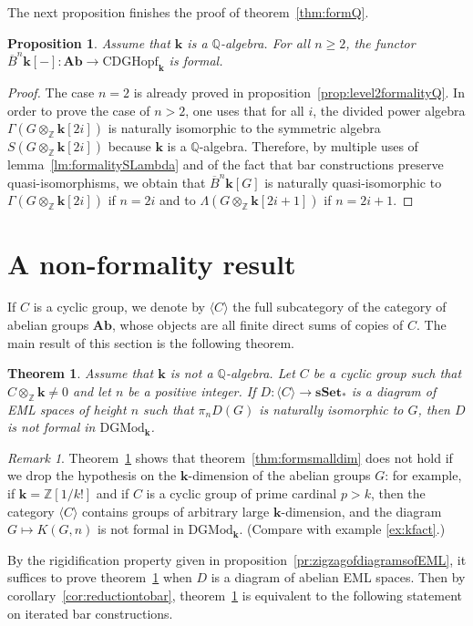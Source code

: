 \documentclass{amsart}
\newtheorem{proposition}[formula]{Proposition}
\newtheorem{theorem}[formula]{Theorem}
\theoremstyle{definition}
\theoremstyle{remark}
\newtheorem{remark}[formula]{Remark}
\newcommand{\Z}{\mathbb Z}
\newcommand{\Q}{\mathbb Q}
\renewcommand{\ge}{\geqslant}
\newcommand{\Ab}{\mathbf{Ab}}
\newcommand{\sset}{\mathbf{sSet}}
\def\k{\mathbf{k}}
\begin{document}
The next proposition finishes the proof of theorem~\ref{thm:formQ}.

\begin{proposition}\label{prop:higherlevelformalityQ}
	Assume that $\k$ is a $\Q$-algebra. For all $n\ge 2$, the functor $\overline{B}^n\k[-]:\Ab\to \mathrm{CDGHopf}_\k$ is formal.   
\end{proposition}
\begin{proof}
	The case $n=2$ is already proved in proposition~\ref{prop:level2formalityQ}. In order to prove the case of $n>2$, one uses that for all $i$, the divided power algebra $\Gamma(G\otimes_\Z\k[2i])$ is naturally isomorphic to the symmetric algebra $S(G\otimes_\Z\k[2i])$ because $\k$ is a $\Q$-algebra. Therefore, by multiple uses of lemma~\ref{lm:formalitySLambda} and of the fact that bar constructions preserve quasi-isomorphisms, we obtain that $\overline{B}^n\k[G]$ is naturally quasi-isomorphic to $\Gamma(G\otimes_\Z\k[2i])$ if $n=2i$ and to $\Lambda(G\otimes_\Z\k[2i+1])$ if $n=2i+1$.
\end{proof}
	
\section{A non-formality result}\label{sec-nonformalityFp}

If $C$ is a cyclic group, we denote by $\langle C\rangle$ the full subcategory of the category of abelian groups $\Ab$, whose objects are all finite direct sums of copies of $C$.
The main result of this section is the following theorem. 
\begin{theorem}\label{thm:nonformality1}
	Assume that $\k$ is not a $\Q$-algebra. Let $C$ be a cyclic group such that $C\otimes_{\Z}\k\ne 0$ and let $n$ be a positive integer. 
    If $D:\langle C\rangle \to \sset_{*}$ is a diagram of EML spaces of height $n$ such that $\pi_nD(G)$ is naturally isomorphic to $G$, then $D$ is not formal in $\mathrm{DGMod}_\k$.    
\end{theorem}
\begin{remark}
Theorem~\ref{thm:nonformality1} shows that theorem~\ref{thm:formsmalldim} does not hold if we drop the hypothesis on the $\k$-dimension of the abelian groups $G$: for example, if $\k=\Z[1/k!]$ and if $C$ is a cyclic group of prime cardinal $p>k$, then the category $\langle C\rangle$ contains groups of arbitrary large $\k$-dimension, and the diagram $G\mapsto K(G,n)$ is not formal in $\mathrm{DGMod}_\k$. (Compare with example \ref{ex:kfact}.)   
\end{remark}
By the rigidification property given in proposition~\ref{pr:zigzagofdiagramsofEML}, it suffices to prove theorem~\ref{thm:nonformality1} when $D$ is a diagram of abelian EML spaces. Then by corollary~\ref{cor:reductiontobar}, theorem~\ref{thm:nonformality1} is equivalent to the following statement on iterated bar constructions.
\end{document}
